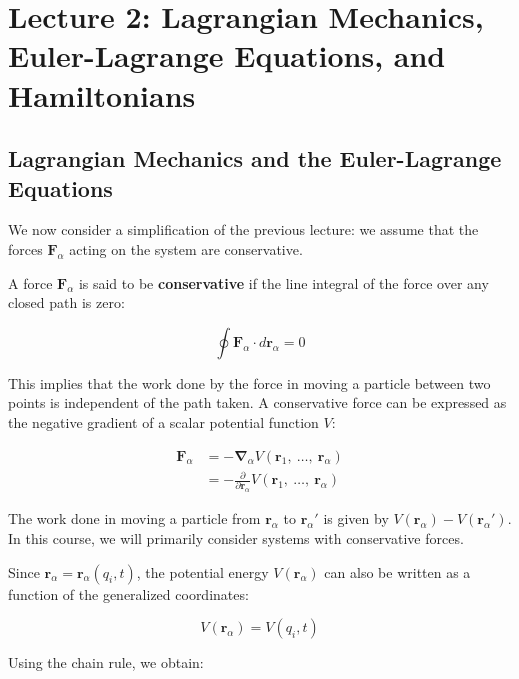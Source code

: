 \section{Lecture 2: Lagrangian Mechanics, Euler-Lagrange Equations, and Hamiltonians}

\subsection{Lagrangian Mechanics and the Euler-Lagrange Equations}

We now consider a simplification of the previous lecture: we assume that the forces 
$\mathbf{F}_\alpha$ acting on the system are conservative.

\begin{definition}
A force $\mathbf{F}_\alpha$ is said to be \textbf{conservative} if the line integral of 
the force over any closed path is zero:

\begin{equation}
    \oint \mathbf{F}_\alpha \cdot d\mathbf{r}_\alpha = 0
\end{equation}

\end{definition}

This implies that the work done by the force in moving a particle between two points is 
independent of the path taken.  A conservative force can be expressed as the negative 
gradient of a scalar potential function $V$:

\begin{align*}
    \mathbf{F}_\alpha &= -\mathbf{\nabla}_\alpha V(\mathbf{r}_1,\ \dots,\ \mathbf{r}_\alpha) \\
    &= - \frac{\partial}{\partial \mathbf{r}_\alpha} V(\mathbf{r}_1,\ \dots,\ \mathbf{r}_\alpha)
\end{align*}

The work done in moving a particle from $\mathbf{r}_\alpha$ to $\mathbf{r}_\alpha'$ is 
given by $V(\mathbf{r}_\alpha) - V(\mathbf{r}_\alpha')$. In this course, we will 
primarily consider systems with conservative forces.

Since $\mathbf{r}_\alpha=\mathbf{r}_\alpha(q_i, t)$, the potential energy 
$V(\mathbf{r}_\alpha)$ can also be written as a function of the generalized coordinates:

\begin{equation}
    V(\mathbf{r}_\alpha)=V(q_i, t)
\end{equation}

Using the chain rule, we obtain:

